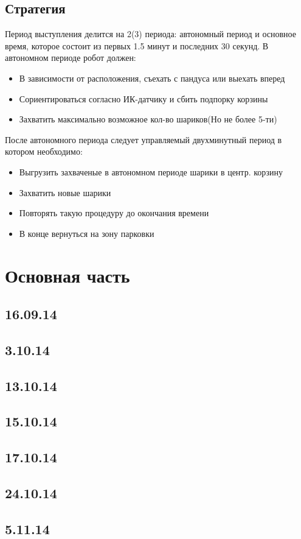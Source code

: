 \documentclass[11pt]{article}
\begin{document}
		\subsection{Стратегия}
			Период выступления делится на 2(3) периода: автономный период и основное время, которое состоит из первых 1.5 минут и последних 30 секунд.
			В автономном периоде робот должен:
			\begin{itemize}
				\item В зависимости от расположения, съехать с пандуса или выехать вперед
				\item Сориентироваться согласно ИК-датчику и сбить подпорку корзины
				\item Захватить максимально возможное кол-во шариков(Но не более 5-ти)
			\end{itemize}
			После автономного периода следует управляемый двухминутный период в котором необходимо:
			\begin{itemize}
				\item Выгрузить захваченые в автономном периоде шарики в центр. корзину
				\item Захватить новые шарики 
				\item Повторять такую процедуру до окончания времени
				\item В конце вернуться на зону парковки
			\end{itemize}
		
	\section{Основная часть}
	
	\subsection{16.09.14}
	
	
	\subsection{3.10.14}
	
	
	\subsection{13.10.14}
	
	
	\subsection{15.10.14}
	
	
	\subsection{17.10.14}
	

	\subsection{24.10.14}
		
	
	\subsection{5.11.14}
		
\end{document}

